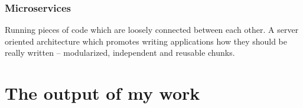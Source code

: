 \documentclass[
  master,
  biblatex,
  glossaries,
  index
]{kidiplom}
\begin{document}
\subsubsection{Microservices}

Running pieces of code which are loosely connected between each other. A server oriented architecture which promotes writing applications how they should be really written -- modularized, independent and reusable chunks. %

\section{The output of my work}


\printbibliography
\end{document}
